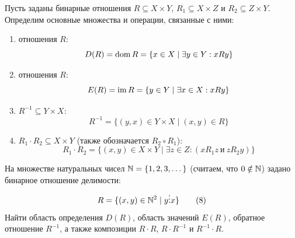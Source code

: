 \begin{definition}
    Пусть заданы бинарные отношения $R \subseteq X \times Y$, 
    $R_1 \subseteq X \times Z$ и $R_2 \subseteq Z \times Y$. Определим 
    основные множества и операции, связанные с ними:
    \begin{enumerate}
        \item {} отношения $R$:
        \[
            D(R) = \operatorname{dom} R = \{x \in X \mid \exists y \in Y : x R y\}
        \]
        \item {} отношения $R$:
        \[
            E(R) = \operatorname{im} R = \{y \in Y \mid \exists x \in X : x R y\}
        \]
        \item {} $R^{-1} \subseteq Y \times X$:
        \[
            R^{-1} = \{(y, x) \in Y \times X \mid (x, y) \in R\}
        \]
        \item {} 
        $R_1 \cdot R_2 \subseteq X \times Y$ (также обозначается 
        $R_2 \circ R_1$):
        \begin{equation} \label{eq:rel_comp_def}
            R_1 \cdot R_2 = \{(x, y) \in X \times Y \mid 
            \exists z \in Z : (x R_1 z \ \text{и} \ z R_2 y)\} \tag{7}
        \end{equation}
    \end{enumerate}
\end{definition}

\begin{problem}
    На множестве натуральных чисел $\mathbb{N} = \{1, 2, 3, \dots\}$ (считаем, что 
    $0 \notin \mathbb{N}$) задано бинарное отношение делимости:
    \begin{equation} \label{eq:div_rel_def}
        R = \{(x, y) \in \mathbb{N}^2 \mid y \vdots x\} \tag{8}
    \end{equation}
    Найти область определения $D(R)$, область значений $E(R)$, обратное 
    отношение $R^{-1}$, а также композиции $R \cdot R$, $R \cdot R^{-1}$ 
    и $R^{-1} \cdot R$.
\end{problem}

